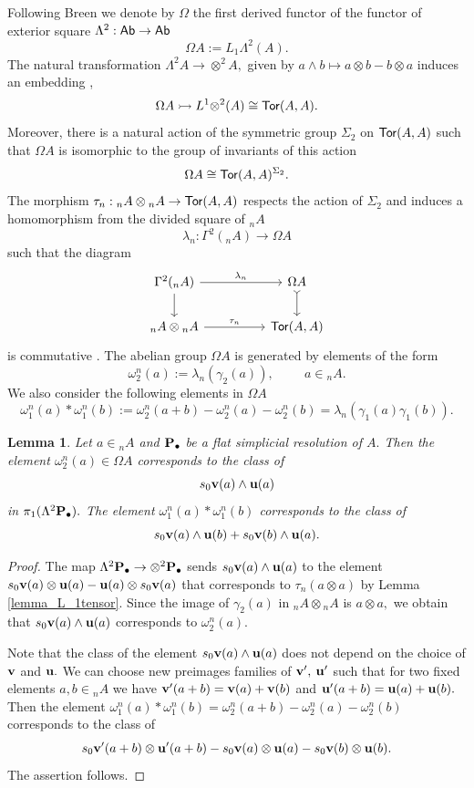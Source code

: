 \documentclass{amsart}
\numberwithin{equation}{section}
\newtheorem{lemma}[theorem]{Lemma}
\theoremstyle{definition}
\def\mono{\rightarrowtail}
\begin{document}
Following Breen we denote by $\Omega$ the first derived functor of the functor of exterior square  $\Lambda^2:{\sf Ab}\to {\sf Ab}$ 
$$\Omega A:=L_{1}\Lambda^2(A).$$ The natural transformation $\Lambda^2 A \to {\otimes}^2 A,$ given by $a\wedge b \mapsto a\otimes b - b\otimes a$ induces an embedding \cite[Th.2.3.3]{jeanphdthesis}, \cite[\S 2.2]{breen2011derived} 
$$\Omega A \mono L^1{\otimes}^2 (A ) \cong {\sf Tor}(A,A).$$ 
Moreover, there is a natural action of the symmetric group $\Sigma_2$ on ${\sf Tor}(A,A)$ such that $\Omega A$ is isomorphic to the group of invariants of this action 
$$\Omega A\cong {\sf Tor}(A,A)^{\Sigma_2}.$$ 
The morphism $\tau_n :{}_nA\otimes {}_nA\to {\sf Tor}(A,A)$ respects the action of $\Sigma_2$ and induces a homomorphism from the divided square of ${}_nA$
$$\lambda_n:\Gamma^2({}_nA)\to \Omega A$$
such that the diagram
$$
\begin{tikzcd}
\Gamma^2({}_nA)\arrow{rr}{\lambda_n}
\arrow{d} & & \Omega A\arrow[rightarrowtail]{d} \\
{}_n A \otimes {}_n A\arrow{rr}{\tau_n} & & {\sf Tor}(A,A)
\end{tikzcd}
$$
is commutative \cite[(5.6)]{breen1999functorial}. 
The abelian group $\Omega A$ is generated by elements of the form  $$\omega_{2}^n(a):=\lambda_n(\gamma_{2}(a)),\hspace{1cm} a\in {}_nA.$$
We also consider the following elements in $\Omega A$ $$\omega^n_1(a)*\omega^n_1(b)
:=\omega_2^n(a+b)-\omega_2^n(a)-\omega_2^n(b)=\lambda_n(\gamma_1(a)\gamma_1(b)).$$



\begin{lemma}\label{lemma_L1exteriorSquare}
Let $a\in {}_nA$ and ${\bf P}_\bullet$ be a flat simplicial resolution of $A.$  Then the element $\omega^n_2(a)\in \Omega A$ corresponds to the class of  $$s_0 {\bf v}(a)\wedge {\bf u}(a)$$ in $\pi_1(\Lambda^2 {\bf P}_\bullet).$ The element $\omega_1^n(a)*\omega_1^n(b)$ corresponds to the class of 
$$s_0{\bf v}(a) \wedge {\bf u}(b) + s_0{\bf v}(b)\wedge {\bf u}(a).$$
\end{lemma}
\begin{proof}
The map $\Lambda^2 {\bf P}_\bullet \to {\otimes}^2{\bf P}_\bullet$ sends $s_0 {\bf v}(a)\wedge {\bf u}(a)$ to the element $s_0 {\bf v}(a)\otimes {\bf u}(a) - {\bf u}(a)\otimes s_0 {\bf v}(a)$ that corresponds to $\tau_n(a\otimes a)$ by Lemma \ref{lemma_L_1tensor}. Since the image of $\gamma_2(a)$ in $ {}_nA\otimes {}_nA$ is $a\otimes a,$ we obtain that $s_0 {\bf v}(a) \wedge {\bf u}(a)$ corresponds to $\omega_2^n(a)$. 

Note that the class of the element $s_0 {\bf v}(a) \wedge {\bf u}(a)$ does not depend on the choice of ${\bf v}$ and ${\bf u}.$ We can choose new preimages families of ${\bf v}',$ ${\bf u}'$ such that for two fixed elements $a,b\in {}_nA$ we have ${\bf v}'(a+b)={\bf v}(a)+{\bf v}(b)$ and   ${\bf u}'(a+b)={\bf u}(a)+{\bf u}(b).$ Then the element $\omega_1^n(a)*\omega_1^n(b)=\omega_2^n(a+b) - \omega_2^n(a) - \omega_2^n(b)$ corresponds to the class of  
$$s_0{\bf v}'(a+b)\otimes {\bf u}'(a+b) - s_0 {\bf v}(a)\otimes {\bf u}(a) - s_0 {\bf v}(b)\otimes {\bf u}(b).$$
The assertion follows.
\end{proof}
\end{document}
